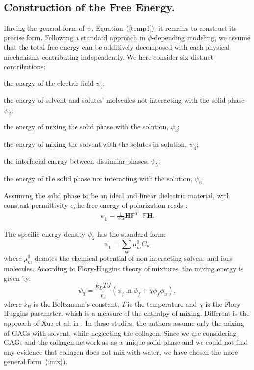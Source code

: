 \documentclass[runningheads]{llncs}
\newcommand{\indentitem}{\setlength\itemindent{20pt}}
\newcommand{\F}{\ensuremath{\mathbb{F}}}
\begin{document}
\subsection{Construction of the Free Energy.}

Having the general form of $\psi$, Equation~(\ref{temp1}), it remains to construct its precise form. Following a standard approach in $\psi$-depending modeling, we assume that the total free energy can be additively decomposed with each physical mechanisms contributing independently. We here consider six distinct contributions:

\begin{enumerate}
	{\indentitem\item[\textbullet] the energy of the electric field $\psi_1$;}
	{\indentitem \item[\textbullet] the energy of solvent and solutes' molecules not interacting with the solid phase $\psi_2$;}
	{\indentitem\item[\textbullet] the energy of mixing the solid phase with the solution, $\psi_3$;}
	{\indentitem\item[\textbullet] the energy of mixing the solvent with the solutes in solution, $\psi_4$;}
	{\indentitem\item[\textbullet] the interfacial energy between dissimilar phases, $\psi_5$;}
	{\indentitem\item[\textbullet] the energy of the solid phase not interacting with the solution, $\psi_6$.}
\end{enumerate}

Assuming the solid phase to be an ideal and linear dielectric material, with constant permittivity $\epsilon$,the free energy of polarization reads \cite{DROZDOV+,Reviewpolyel}:
\begin{gather}
\psi_1 = \frac{1}{2\epsilon J} \mathbf{H}\F^T \cdot \F \mathbf{H}.
\end{gather}

The specific energy density $\psi_2$ has the standard form:
\begin{equation}
\psi_1 = \sum\limits_{m} \mu^0_m C_m
\end{equation} 
where $\mu^0_m$ denotes the chemical potential of non interacting solvent and ions molecules. According to Flory-Huggins theory \cite{flory,hug} of mixtures, the mixing energy is given by:
\begin{equation}
\psi_3 = \frac{k_B T J}{v_s} \left(\phi_f \ln \phi_f + \chi \phi_f \phi_n\right),\label{mix}
\end{equation}
where $k_B$ is the Boltzmann's constant, $T$ is the temperature and $\chi$ is the Flory-Huggins parameter, which is a measure of the enthalpy of mixing. Different is the approach of Xue et al. in \cite{ecm1,ecm2}. In these studies, the authors assume only the mixing of GAGs with solvent, while neglecting the collagen. Since we are considering GAGs and the collagen network as as a unique solid phase and we could not find any evidence that collagen does not mix with water, we have chosen the more general form~(\ref{mix}).
\end{document}
